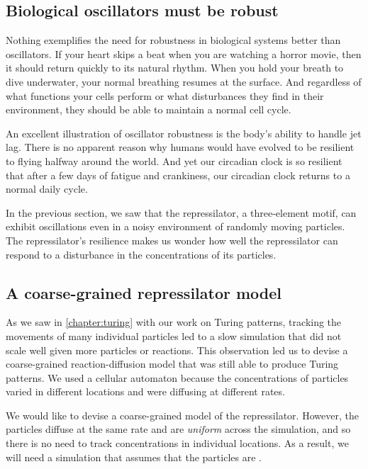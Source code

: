 \subsection{Biological oscillators must be robust}

Nothing exemplifies the need for robustness in biological systems better than oscillators. If your heart skips a beat when you are watching a horror movie, then it should return quickly to its natural rhythm. When you hold your breath to dive underwater, your normal breathing resumes at the surface. And regardless of what functions your cells perform or what disturbances they find in their environment, they should be able to maintain a normal cell cycle.

An excellent illustration of oscillator robustness is the body's ability to handle jet lag. There is no apparent reason why humans would have evolved to be resilient to flying halfway around the world. And yet our circadian clock is so resilient that after a few days of fatigue and crankiness, our circadian clock returns to a normal daily cycle.

In the previous section, we saw that the repressilator, a three-element motif, can exhibit oscillations even in a noisy environment of randomly moving particles. The repressilator's resilience makes us wonder how well the repressilator can respond to a disturbance in the concentrations of its particles.

\FloatBarrier
{}
\subsection{A coarse-grained repressilator model}

As we saw in \autoref{chapter:turing} with our work on Turing patterns, tracking the movements of many individual particles led to a slow simulation that did not scale well given more particles or reactions. This observation led us to devise a coarse-grained reaction-diffusion model that was still able to produce Turing patterns. We used a cellular automaton because the concentrations of particles varied in different locations and were diffusing at different rates.

We would like to devise a coarse-grained model of the repressilator. However, the particles diffuse at the same rate and are \textit{uniform} across the simulation, and so there is no need to track concentrations in individual locations. As a result, we will need a simulation that assumes that the particles are .

